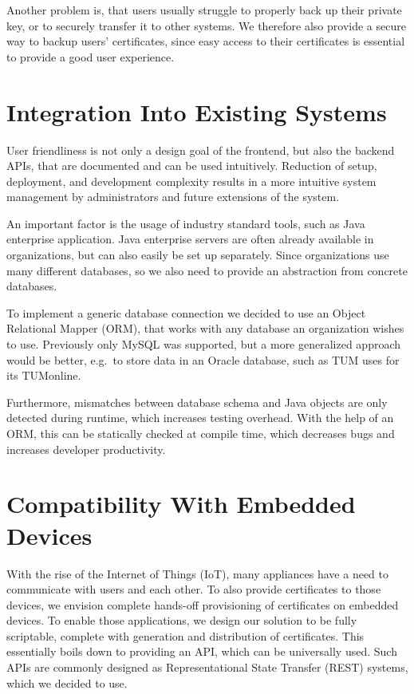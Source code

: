 Another problem is, that users usually struggle to properly back up their private key, or to securely transfer it to
other systems.
We therefore also provide a secure way to backup users' certificates, since easy access to their certificates is
essential to provide a good user experience.

\section{Integration Into Existing Systems}\label{sec:integrationIntoExistingSystems}
User friendliness is not only a design goal of the frontend, but also the backend APIs, that are documented and can be
used intuitively.
Reduction of setup, deployment, and development complexity results in a more intuitive system management by
administrators and future extensions of the system.

An important factor is the usage of industry standard tools, such as Java enterprise application.
Java enterprise servers are often already available in organizations, but can also easily be set up separately.
Since organizations use many different databases, so we also need to provide an abstraction from concrete databases.

To implement a generic database connection we decided to use an Object Relational Mapper (ORM), that works with any
database an organization wishes to use.
Previously only MySQL was supported, but a more generalized approach would be better, e.g.\ to store data in an Oracle
database, such as TUM uses for its TUMonline.

Furthermore, mismatches between database schema and Java objects are only detected during runtime, which increases
testing overhead.
With the help of an ORM, this can be statically checked at compile time, which decreases bugs and increases developer
productivity.

\section{Compatibility With Embedded Devices}\label{sec:compatibilityWithEmbeddedDevices}
With the rise of the Internet of Things (IoT), many appliances have a need to communicate with users and each other.
To also provide certificates to those devices, we envision complete hands-off provisioning of certificates on embedded
devices.
To enable those applications, we design our solution to be fully scriptable, complete with generation and distribution
of certificates.
This essentially boils down to providing an API, which can be universally used.
Such APIs are commonly designed as Representational State Transfer (REST) systems, which we decided to use.

